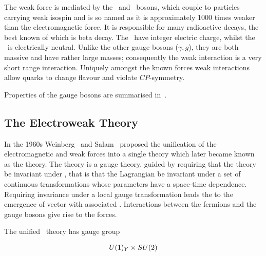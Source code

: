The weak force is mediated by the \Wpm\ and \Z\ bosons, which couple to particles
carrying weak isospin and is so named as it is approximately 1000 times weaker
than the electromagnetic force. 
It is responsible for many radioactive decays, the best known of which is beta decay.
 The \Wpm\ have integer electric
charge, whilst the \Z\ is electrically neutral. Unlike the other gauge bosons
($\gamma,g$), they are both massive and have rather large masses; consequently the weak
interaction is a very short range interaction.  Uniquely amongst
the known forces weak interactions allow quarks to change flavour and violate
$CP$-symmetry.

Properties of the gauge bosons are summarised in~.




\subsection{The Electroweak Theory}

In the 1960s Weinberg~\cite{PhysRevLett.19.1264} and Salam~\cite{Salam1964168} proposed the unification of the electromagnetic
and weak forces into a single theory which later became known as the
 theory. The theory is a gauge theory, guided by requiring that the theory be
invariant under , that is that the Lagrangian
be invariant under a set of continuous transformations whose parameters have a space-time dependence. 
Requiring invariance under a local gauge transformation leads the to the emergence of
vector  with associated . Interactions
between the fermions and the gauge bosons give rise to the forces.

The unified \ew\ theory has gauge group

\begin{align}
U(1)_{Y} \times SU(2) 
\end{align}

